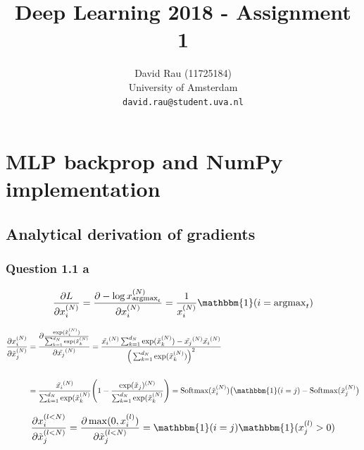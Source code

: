 \documentclass{article}
\title{Deep Learning 2018 - Assignment 1}
\author{
  David Rau (11725184) \\ 
  University of Amsterdam \\
  \texttt{david.rau@student.uva.nl} \\
}
\begin{document}

\maketitle



\section{MLP backprop and NumPy implementation}


\subsection{Analytical derivation of gradients}

\subsubsection*{Question 1.1 a}
\begin{equation}
\frac{\partial L }{\partial x_i^{(N)}} = \frac{\partial - \log x^{(N)}_{\operatorname{argmax}_t}}{\partial x_i^{(N)}} = \frac{1}{x_i^{(N)}}\mathbbm{1}(i=\operatorname{argmax}_t)
\end{equation}

\begin{equation}
\begin{aligned}
\frac{\partial x_i^{(N)} }{\partial \tilde{x}_j^{(N)}} 
& = \frac{\partial \frac{\exp(\tilde{x}_i^{(N)})}{\sum_{k=1}^{d_N} \exp(\tilde{x}_k^{(N)}}}{\partial \tilde{x_j}^{(N)}} 
= \frac{\tilde{x_i}^{(N)} \sum_{k=1}^{d_N} \exp(\tilde{x}_k^{(N)}) -  \tilde{x_j}^{(N)} \tilde{x_i}^{(N)}}{\Big(\sum_{k=1}^{d_N} \exp(\tilde{x}_k^{(N)}) \Big)^2} \\
 \\
& = \frac{\tilde{x_i}^{(N)}}{\sum_{k=1}^{d_N} \exp(\tilde{x}_k^{(N)}} \Bigg(1 -\frac{\exp(\tilde{x}_j)^{(N)}}{\sum_{k=1}^{d_N} \exp(\tilde{x}_k^{(N)}} \Bigg) 
=\text{Softmax}(\tilde{x}_i^{(N)})\big( \mathbbm{1}(i=j) - \text{Softmax}(\tilde{x}_j^{(N)} \big) \\
\end{aligned}
\end{equation}

\begin{equation}
\frac{\partial x_i^{(l<N)} }{\partial \tilde{x}_j^{(l<N)}} = 
\frac{\partial \max(0, x_i^{(l)}) }{\partial \tilde{x}_j^{(l<N)}} = \mathbbm{1}(i=j)\mathbbm{1}(x_j^{(l)} > 0)
\end{equation}
\end{document}
